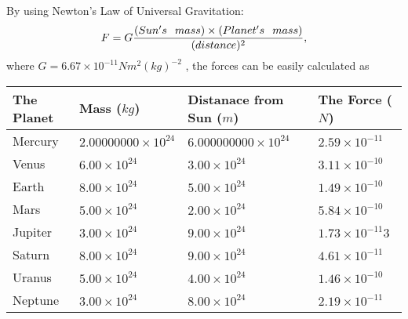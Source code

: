 \documentclass[12pt]{article}
\begin{document}
 

 
 
 
 
\noindent{}
 
 

By using Newton's Law of Universal Gravitation:
\[
F=G \frac{(Sun's \hspace{0.1in} mass) \times (Planet's \hspace{0.1in} mass)} { (distance)^2},
\]
where
$ G= %
6.67 \times 10^{-11} N m^{2}(kg)^{-2}$ , the forces can be easily calculated as
 
\vspace{0.2in}
 
 
\begin{tabular}{|l|l|l|l|}
\hline
The Planet & Mass ($kg$) & Distanace from Sun ($m$) & The Force ($N$)\\
\hline
Mercury  &
           $ %
2.00000000 \times 10^{24}  $   &
             $ %
6.000000000 \times 10^{24}$    & $ %
2.59 \times 10^{-11} $
\\  \hline
Venus    &
           $  %
6.00 \times 10^{24}  $     &
             $ %
3.00 \times 10^{24} $    & $ %
3.11 \times 10^{-10} $
\\  \hline
Earth    &
           $  %
8.00 \times 10^{24}$     &
             $ %
5.00 \times 10^{24} $    & $ %
1.49 \times 10^{-10} $
\\   \hline
Mars     &
           $  %
5.00 \times 10^{24} $     &
             $ %
2.00 \times 10^{24}$    & $ %
5.84 \times 10^{-10} $
\\   \hline
Jupiter  &
           $  %
3.00 \times 10^{24}  $    &
             $ %
9.00 \times 10^{24} $    & $ %
1.73 \times 10^{-11}3 $
\\  \hline
Saturn   &
           $  %
8.00 \times 10^{24}   $    &
             $ %
9.00 \times 10^{24}  $    & $ %
4.61 \times 10^{-11} $
\\  \hline
Uranus   &
           $  %
5.00 \times 10^{24} $    &
             $ %
4.00 \times 10^{24}$    & $ %
1.46 \times 10^{-10} $
\\  \hline
Neptune  &
           $  %
3.00 \times 10^{24}  $    &
             $ %
8.00 \times 10^{24} $    & $ %
2.19 \times 10^{-11} $
\\  \hline
 
\end{tabular}
 
 
 
 
\noindent{}
 
\end{document}
